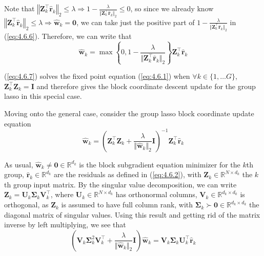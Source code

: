 \documentclass{article}
\numberwithin{equation}{section}
\begin{document}
Note that $ \left\Vert\mathbf{Z}_k^\top\hat{\mathbf{r}}_k\right\Vert_2 \le
\lambda \Rightarrow 1 - \frac{
    \lambda
}{
    \Vert\mathbf{Z}_k^\top\hat{\mathbf{r}}_k\Vert_2
}
\le 0 $, so since we already know
$ \left\Vert\mathbf{Z}_k^\top\hat{\mathbf{r}}_k\right\Vert_2 \le \lambda
\Rightarrow \hat{\mathbf{w}}_k = \mathbf{0} $, we can take just the positive
part of $ 1 - \frac{\lambda}{\Vert\mathbf{Z}_k^\top\hat{\mathbf{r}}_k\Vert_2} $
in (\ref{eq:4.6.6}). Therefore, we can write that
\begin{equation} \label{eq:4.6.7}
    \hat{\mathbf{w}}_k =
    \max\left\{
        0, 1 - \frac{\lambda}{\Vert\mathbf{Z}_k^\top\hat{\mathbf{r}}_k\Vert_2}
    \right\}
    \mathbf{Z}_k^\top\hat{\mathbf{r}}_k
\end{equation}

(\ref{eq:4.6.7}) solves the fixed point equation (\ref{eq:4.6.1}) when
$ \forall k \in \{1, \ldots G\} $,
$ \mathbf{Z}_k^\top\mathbf{Z}_k = \mathbf{I} $ and therefore gives the block
coordinate descent update for the group lasso in this special case.


Moving onto the general case, consider the group lasso block coordinate update
equation
\begin{equation} \label{eq:4.7.1}
    \hat{\mathbf{w}}_k =
    \left(
        \mathbf{Z}_k^\top\mathbf{Z}_k +
        \frac{\lambda}{\Vert\hat{\mathbf{w}}_k\Vert_2}\mathbf{I}
    \right)^{-1}
    \mathbf{Z}_k^\top\hat{\mathbf{r}}_k
\end{equation}

As usual, $ \hat{\mathbf{w}}_k \ne \mathbf{0} \in \mathbb{R}^{d_k} $ is the
block subgradient equation minimizer for the $ k $th group,
$ \hat{\mathbf{r}}_k \in \mathbb{R}^{d_k} $ are the residuals as defined in
(\ref{eq:4.6.2}), with $ \mathbf{Z}_k \in \mathbb{R}^{N \times d_k} $ the
$ k $th group input matrix. By the singular value decomposition, we can write
$ \mathbf{Z}_k = \mathbf{U}_k\mathbf{\Sigma}_k\mathbf{V}_k^\top $, where
$ \mathbf{U}_k \in \mathbb{R}^{N \times d_k} $ has orthonormal columns,
$ \mathbf{V}_k \in \mathbb{R}^{d_k \times d_k} $ is orthogonal, as
$ \mathbf{Z}_k $ is assumed to have full column rank, with
$ \mathbf{\Sigma}_k \succ \mathbf{0} \in \mathbb{R}^{d_k \times d_k} $ the
diagonal matrix of singular values. Using this result and getting rid of the
matrix inverse by left multiplying, we see that
\begin{equation*}
    \left(
        \mathbf{V}_k\mathbf{\Sigma}_k^2\mathbf{V}_k^\top +
        \frac{\lambda}{\Vert\hat{\mathbf{w}}_k\Vert_2}\mathbf{I}
    \right)
    \hat{\mathbf{w}}_k =
    \mathbf{V}_k\mathbf{\Sigma}_k\mathbf{U}_k^\top\hat{\mathbf{r}}_k
\end{equation*}
\end{document}
